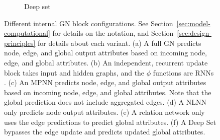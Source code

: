 \begin{figure}[t!]
\begin{subfigure}[b]{0.49\textwidth}
        \caption{Deep set}
        \label{fig:gn-deepset-block}
    \end{subfigure}
    \caption{Different internal GN block configurations. See Section~\ref{sec:model-computational} for details on the notation, and Section~\ref{sec:design-principles} for details about each variant. 
    (a) A full GN predicts node, edge, and global output attributes based on incoming node, edge, and global attributes. 
    (b) An independent, recurrent update block takes input and hidden graphs, and the $\phi$ functions are RNNs \citep{sanchez2018graph}.
    (c) An MPNN \citep{gilmer2017neural} predicts node, edge, and global output attributes based on incoming node, edge, and global attributes. Note that the global prediction does not include aggregated edges. (d) A NLNN \citep{wang2017non} only predicts node output attributes. (e) A relation network \citep{raposo2017discovering,santoro2017simple} only uses the edge predictions to predict global attributes. (f) A Deep Set \citep{zaheer2017deep} bypasses the edge update and predicts updated global attributes. }
    \label{fig:gn-partial}
\end{figure}


